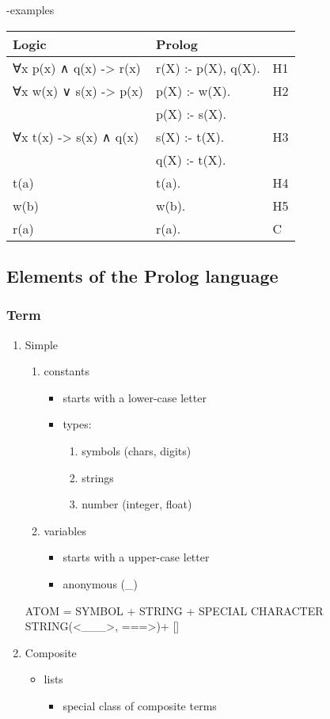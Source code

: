 \documentclass[11pt]{article}
\begin{document}
-examples
\begin{center}
\begin{tabular}{lll}
\hline
Logic & Prolog & \\
\hline
∀x p(x) ∧ q(x) -> r(x) & r(X) :- p(X), q(X). & H1\\
\hline
∀x w(x) ∨ s(x) -> p(x) & p(X) :- w(X). & H2\\
 & p(X) :- s(X). & \\
\hline
∀x t(x) -> s(x) ∧ q(x) & s(X) :- t(X). & H3\\
 & q(X) :- t(X). & \\
\hline
t(a) & t(a). & H4\\
\hline
w(b) & w(b). & H5\\
\hline
r(a) & r(a). & C\\
\hline
\end{tabular}
\end{center}
\subsection{Elements of the Prolog language}
\label{sec:org3a152ba}
\subsubsection{Term}
\label{sec:orgaa7acd5}
\begin{enumerate}
\item Simple
\label{sec:org3ea1156}
\begin{enumerate}
\item constants
\begin{itemize}
\item starts with a lower-case letter
\item types:
\begin{enumerate}
\item symbols (chars, digits)
\item strings
\item number (integer, float)
\end{enumerate}
\end{itemize}
\item variables
\begin{itemize}
\item starts with a upper-case letter
\item anonymous (\_)
\end{itemize}
\end{enumerate}
ATOM = SYMBOL + STRING + SPECIAL CHARACTER STRING(<\_\_\_>, ===>)+ []
\item Composite
\label{sec:org2e19d81}
\begin{itemize}
\item lists
\begin{itemize}
\item special class of composite terms
\end{itemize}
\end{itemize}
\end{enumerate}
\end{document}
